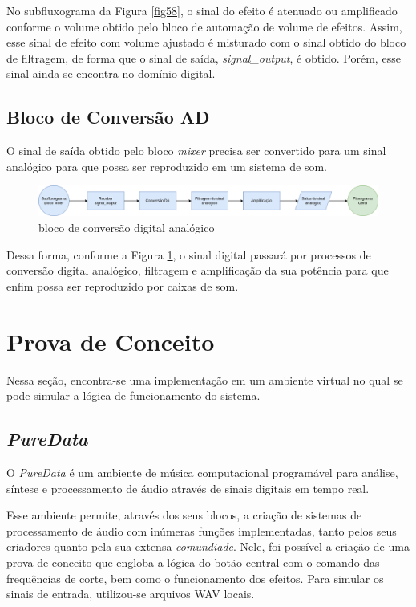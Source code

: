 No subfluxograma da Figura \ref{fig58}, o sinal do efeito é atenuado ou amplificado conforme o volume obtido pelo bloco de automação de volume de efeitos. Assim, esse sinal de efeito com volume ajustado é misturado com o sinal obtido do bloco de filtragem, de forma que o sinal de saída, \textit{signal\_output}, é obtido. Porém, esse sinal ainda se encontra no domínio digital.

\subsection{Bloco de Conversão AD}

O sinal de saída obtido pelo bloco \textit{mixer} precisa ser convertido para um sinal analógico para que possa ser reproduzido em um sistema de som.

\begin{figure}[h]
    \centering
    \includegraphics[width=\textwidth]{figuras/fig59.png}
    \caption{bloco de conversão digital analógico}
    \label{fig59}
\end{figure}

Dessa forma, conforme a Figura \ref{fig59}, o sinal digital passará por processos de conversão digital analógico, filtragem e amplificação da sua potência para que enfim possa ser reproduzido por caixas de som.


\newpage
\section{Prova de Conceito}

Nessa seção, encontra-se uma implementação em um ambiente virtual no qual se pode simular a lógica de funcionamento do sistema.

\subsection{\textit{PureData}}
O \textit{PureData} \cite{puredata} é um ambiente de música computacional programável para análise, síntese e processamento de áudio através de sinais digitais em tempo real.

Esse ambiente permite, através dos seus blocos, a criação de sistemas de processamento de áudio com inúmeras funções implementadas, tanto pelos seus criadores quanto pela sua extensa \textit{comundiade}. Nele, foi possível a criação de uma prova de conceito que engloba a lógica do botão central com o comando das frequências de corte, bem como o funcionamento dos efeitos. Para simular os sinais de entrada, utilizou-se arquivos WAV locais.

